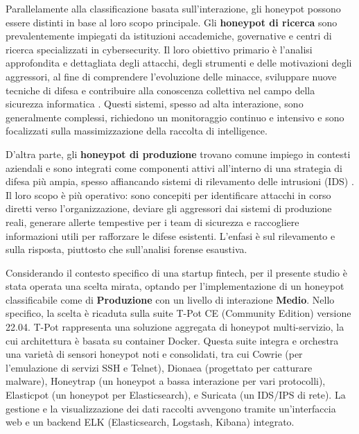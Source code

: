 Parallelamente alla classificazione basata sull'interazione, gli honeypot possono essere distinti in base al loro scopo principale. Gli \textbf{honeypot di ricerca} sono prevalentemente impiegati da istituzioni accademiche, governative e centri di ricerca specializzati in cybersecurity. Il loro obiettivo primario è l'analisi approfondita e dettagliata degli attacchi, degli strumenti e delle motivazioni degli aggressori, al fine di comprendere l'evoluzione delle minacce, sviluppare nuove tecniche di difesa e contribuire alla conoscenza collettiva nel campo della sicurezza informatica \cite{proofpoint2024}. Questi sistemi, spesso ad alta interazione, sono generalmente complessi, richiedono un monitoraggio continuo e intensivo e sono focalizzati sulla massimizzazione della raccolta di intelligence.



D'altra parte, gli \textbf{honeypot di produzione} trovano comune impiego in contesti aziendali e sono integrati come componenti attivi all'interno di una strategia di difesa più ampia, spesso affiancando sistemi di rilevamento delle intrusioni (IDS) \cite{proofpoint2024}. Il loro scopo è più operativo: sono concepiti per identificare attacchi in corso diretti verso l'organizzazione, deviare gli aggressori dai sistemi di produzione reali, generare allerte tempestive per i team di sicurezza e raccogliere informazioni utili per rafforzare le difese esistenti. L'enfasi è sul rilevamento e sulla risposta, piuttosto che sull'analisi forense esaustiva.



Considerando il contesto specifico di una startup fintech, per il presente studio è stata operata una scelta mirata, optando per l'implementazione di un honeypot classificabile come di \textbf{Produzione} con un livello di interazione \textbf{Medio}. Nello specifico, la scelta è ricaduta sulla suite T-Pot CE (Community Edition) versione 22.04. T-Pot rappresenta una soluzione aggregata di honeypot multi-servizio, la cui architettura è basata su container Docker. Questa suite integra e orchestra una varietà di sensori honeypot noti e consolidati, tra cui Cowrie (per l'emulazione di servizi SSH e Telnet), Dionaea (progettato per catturare malware), Honeytrap (un honeypot a bassa interazione per vari protocolli), Elasticpot (un honeypot per Elasticsearch), e Suricata (un IDS/IPS di rete). La gestione e la visualizzazione dei dati raccolti avvengono tramite un'interfaccia web e un backend ELK (Elasticsearch, Logstash, Kibana) integrato.



